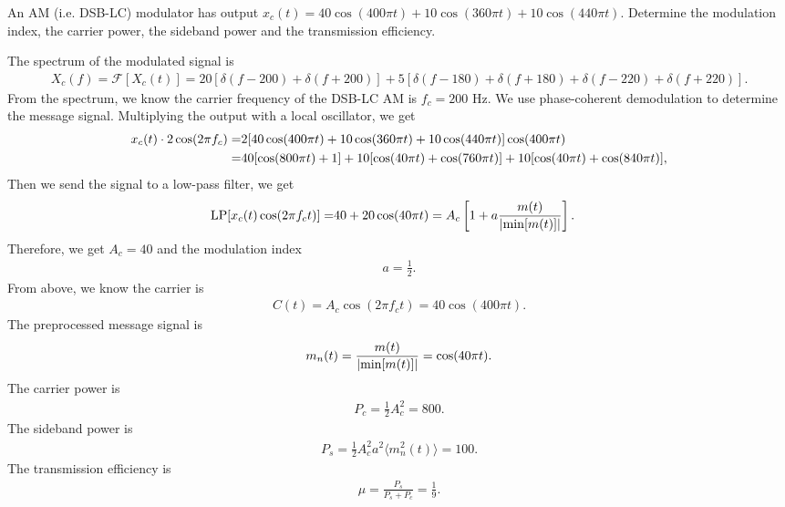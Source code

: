 \documentclass{assignment}
\begin{document}
\begin{prob}
    An AM (i.e. DSB-LC) modulator has output $x_c(t)=40\cos(400\pi t)+10\cos(360\pi t)+10\cos(440\pi t)$. Determine the modulation index, the carrier power, the sideband power and the transmission efficiency.
\end{prob}
\begin{sol}
    The spectrum of the modulated signal is
    \begin{align}
        X_c(f)=\mathscr{F}[X_c(t)]=20[\delta(f-200)+\delta(f+200)]+5[\delta(f-180)+\delta(f+180)+\delta(f-220)+\delta(f+220)].
    \end{align}
    From the spectrum, we know the carrier frequency of the DSB-LC AM is $f_c=200$ Hz.
    We use phase-coherent demodulation to determine the message signal. Multiplying the output with a local oscillator, we get
    \begin{align}
        \notag x_c(t)\cdot 2\cos(2\pi f_c)=&2[40\cos(400\pi t)+10\cos(360\pi t)+10\cos(440\pi t)]\cos(400\pi t)\\
        =&40[\cos(800\pi t)+1]+10[\cos(40\pi t)+\cos(760\pi t)]+10[\cos(40\pi t)+\cos(840\pi t)],
    \end{align}
    Then we send the signal to a low-pass filter, we get
    \begin{align}
        \text{LP}[x_c(t)\cos(2\pi f_ct)]=&40+20\cos(40\pi t)=A_c\left[1+a\frac{m(t)}{\left\lvert\min[m(t)]\right\rvert}\right].
    \end{align}
    Therefore, we get $A_c=40$ and the modulation index
    \begin{align}
        a=\frac{1}{2}.
    \end{align}
    From above, we know the carrier is
    \begin{align}
        C(t)=A_c\cos(2\pi f_ct)=40\cos(400\pi t).
    \end{align}
    The preprocessed message signal is
    \begin{align}
        m_n(t)=\frac{m(t)}{\left\lvert\min[m(t)]\right\rvert}=\cos(40\pi t).
    \end{align}
    The carrier power is
    \begin{align}
        P_c=\frac{1}{2}A_c^2=800.
    \end{align}
    The sideband power is
    \begin{align}
        P_s=\frac{1}{2}A_c^2a^2\langle m_n^2(t)\rangle=100.
    \end{align}
    The transmission efficiency is
    \begin{align}
        \mu=\frac{P_s}{P_s+P_c}=\frac{1}{9}.
    \end{align}
\end{sol}
\end{document}
